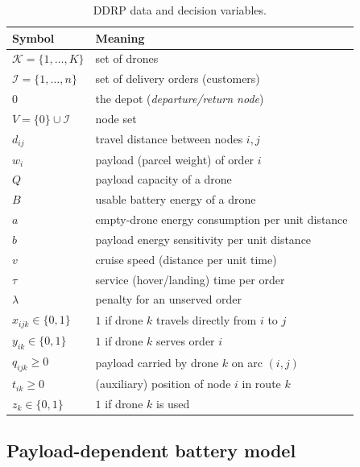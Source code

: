 \documentclass[11pt,a4paper]{article}
\begin{document}
\begin{table}[H]
\centering
\caption{DDRP data and decision variables.}
\label{tab:ddrp}
\begin{tabular}{@{}ll@{}}
\toprule
Symbol & Meaning \\
\midrule
$\mathcal{K}=\{1,\dots,K\}$      & set of drones \\
$\mathcal{I}=\{1,\dots,n\}$      & set of delivery orders (customers) \\
$0$                              & the depot (\emph{departure/return node}) \\
$V=\{0\}\cup\mathcal{I}$         & node set \\
$d_{ij}$                         & travel distance between nodes $i,j$ \\
$w_{i}$                          & payload (parcel weight) of order $i$ \\
$Q$                              & payload capacity of a drone \\
$B$                              & usable battery energy of a drone \\
$a$                              & empty-drone energy consumption per unit distance \\
$b$                              & payload energy sensitivity per unit distance \\
$v$                              & cruise speed (distance per unit time) \\
$\tau$                           & service (hover/landing) time per order \\
$\lambda$                        & penalty for an unserved order \\
\addlinespace
$x_{ijk}\in\{0,1\}$              & $1$ if drone $k$ travels directly from $i$ to $j$ \\
$y_{ik}\in\{0,1\}$               & $1$ if drone $k$ serves order $i$ \\
$q_{ijk}\ge 0$                   & payload carried by drone $k$ on arc $(i,j)$ \\
$t_{ik}\ge 0$                    & (auxiliary) position of node $i$ in route $k$ \\
$z_{k}\in\{0,1\}$                & $1$ if drone $k$ is used \\
\bottomrule
\end{tabular}
\end{table}

\subsection{Payload-dependent battery model}
\end{document}
